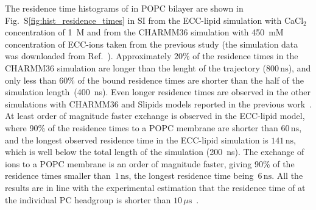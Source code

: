 \documentclass[aip,jcp,twocolumn]{revtex4}
\begin{document}
The residence time histograms of 
in POPC bilayer are shown in Fig.~S\ref{fig:hist_residence_times} in SI 
from the ECC-lipid simulation with CaCl$_2$ concentration of 1~M
and from the CHARMM36 simulation with 450~mM concentration of
ECC-ions taken from the previous study \cite{javanainen17}
(the simulation data was downloaded from Ref.~).
Approximately 20\% of the  residence times in the CHARMM36 simulation are longer than
the lenght of the trajectory ($800\,\mathrm{ns}$),
and only less than 60\% of the bound residence times are shorter than the half
of the simulation length~(400~ns).
Even longer residence times are observed
in the other simulations with CHARMM36 and Slipids models reported in the previous work~\cite{javanainen17}.
At least order of magnitude faster exchange is observed in the
ECC-lipid model, where 90\% of the  residence times to a POPC membrane are 
shorter than $60\,\mathrm{ns}$, %
and the longest observed residence time in the ECC-lipid simulation is $141\,\mathrm{ns}$, 
which is well below the total length of the simulation (200~ns).
The exchange of  ions to a POPC membrane is
an order of magnitude faster, giving 90\%
of the residence times smaller than~$1\,\mathrm{ns}$,
the longest residence time being~$6\,\mathrm{ns}$. 
All the results are in line with the experimental estimation that 
the residence time of  at the individual PC headgroup 
is shorter than $10\,\mu\mathrm{s}$~\cite{altenbach84}.


\end{document}
